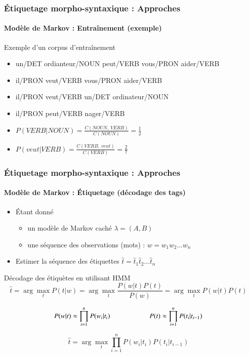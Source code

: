 \documentclass[xcolor=table]{beamer}
\begin{document}
\begin{frame}
\frametitle{Étiquetage morpho-syntaxique : Approches}
\framesubtitle{Modèle de Markov : Entraînement (exemple)}

\begin{exampleblock}{Exemple d'un corpus d'entraînement}
	\begin{itemize}
		\item un/DET ordianteur/NOUN peut/VERB vous/PRON aider/VERB
		\item il/PRON veut/VERB vous/PRON aider/VERB
		\item il/PRON veut/VERB un/DET ordinateur/NOUN
		\item il/PRON peut/VERB nager/VERB
	\end{itemize}
\end{exampleblock}

\begin{itemize}
	\item $P(VERB | NOUN) = \frac{C(NOUN,\ VERB)}{C(NOUN)} = \frac{1}{2}$
	\item $P(veut | VERB) = \frac{C(VERB,\ veut)}{C(VERB)} = \frac{2}{7}$
\end{itemize}

\end{frame}

\begin{frame}
\frametitle{Étiquetage morpho-syntaxique : Approches}
\framesubtitle{Modèle de Markov : Étiquetage (décodage des tags)}

\begin{itemize}
	\item Étant donné 
	\begin{itemize}
		\item un modèle de Markov caché $\lambda = (A, B)$
		\item une séquence des observations (mots) : $w = w_1 w_2 \ldots w_n$
	\end{itemize}
	\item Estimer la séquence des étiquettes $\hat{t} = \hat{t}_1 \hat{t}_2 \ldots \hat{t}_n$
\end{itemize}

\begin{block}{Décodage des étiquètes en utilisant HMM}
	\[
	\hat{t} = \arg\max\limits_t P(t | w) = \arg\max\limits_t \frac{P(w|t) P(t)}{P(w)} = \arg\max\limits_t P(w|t) P(t)%
	\]
	
	\[ 
	P(w | t) \approx \prod\limits_{i=1}^n P(w_i|t_i) 
	\hskip2cm
	P(t) \approx \prod\limits_{i=1}^n P(t_i|t_{i-1}) 
	\]
	
	\[
	\hat{t} = \arg\max\limits_t \prod\limits_{i=1}^n P(w_i|t_i) P(t_i|t_{i-1})
	\]
\end{block}

\end{frame}
\end{document}

